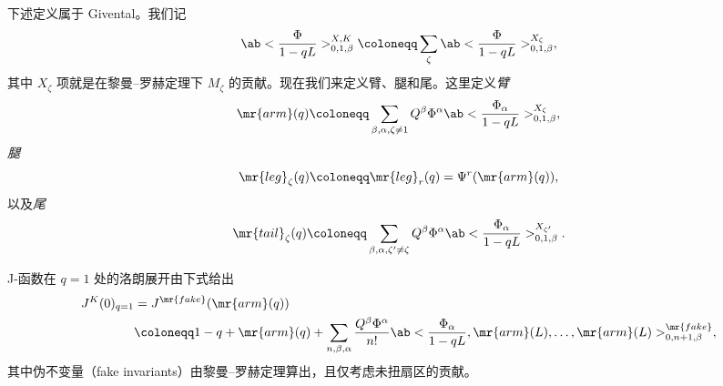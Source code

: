 %
%

下述定义属于 Givental。我们记
\[ \ab<\frac{\Phi}{1-qL}>_{0,1,\beta}^{X,K} \coloneqq \sum_{\zeta} \ab<\frac{\Phi}{1-qL}>_{0,1,\beta}^{X_{\zeta}}, \]
其中 \(X_{\zeta}\) 项就是在黎曼--罗赫定理下 \(M_{\zeta}\) 的贡献。现在我们来定义臂、腿和尾。这里定义\textit{臂}
\[ \mr{arm}(q) \coloneqq \sum_{\beta, \alpha, \zeta \neq 1} Q^{\beta} \Phi^{\alpha}\ab<\frac{\Phi_{\alpha}}{1-qL}>_{0,1,\beta}^{X_{\zeta}}, \]
\textit{腿}
\[ \mr{leg}_{\zeta}(q) \coloneqq \mr{leg}_r(q) = \Psi^r (\mr{arm}(q)), \]
以及\textit{尾}
\[ \mr{tail}_{\zeta}(q) \coloneqq \sum_{\beta, \alpha, \zeta' \neq \zeta} Q^{\beta} \Phi^{\alpha} \ab<\frac{\Phi_{\alpha}}{1-qL}>_{0,1,\beta}^{X_{\zeta'}}. \]

\begin{prop}
    J-函数在 \(q = 1\) 处的洛朗展开由下式给出
    \begin{align*}
        J^K(0)_{q=1} &= J^{\mr{fake}}(\mr{arm}(q)) \\
        &\coloneqq 1-q + \mr{arm}(q) + \sum_{n,\beta,\alpha} \frac{Q^{\beta}\Phi^{\alpha}}{n!} \ab<\frac{\Phi_{\alpha}}{1-qL}, \mr{arm}(L), \ldots, \mr{arm}(L)>_{0,n+1,\beta}^{\mr{fake}},
    \end{align*}
    其中伪不变量（fake invariants）由黎曼--罗赫定理算出，且仅考虑未扭扇区的贡献。
\end{prop}

